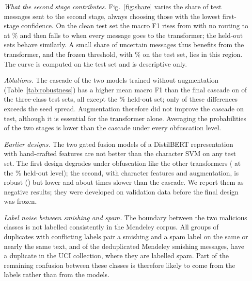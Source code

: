\emph{What the second stage contributes.} Fig.~\ref{fig:share} varies the share of test messages sent to the second stage, always choosing those with the lowest first-stage confidence. On the clean test set the macro F1 rises from  with no routing to  at \% and then falls to  when every message goes to the transformer; the held-out sets behave similarly. A small share of uncertain messages thus benefits from the transformer, and the frozen threshold, with \% on the test set, lies in this region. The curve is computed on the test set and is descriptive only.

\emph{Ablations.} The cascade of the two models trained without augmentation (Table~\ref{tab:robustness}) has a higher mean macro F1 than the final cascade on  of the  three-class test sets, all except the \% held-out set; only  of these differences exceeds the seed spread. Augmentation therefore did not improve the cascade on test, although it is essential for the transformer alone. Averaging the probabilities of the two stages is lower than the cascade under every obfuscation level.

\emph{Earlier designs.} The two gated fusion models of a DistilBERT representation with hand-crafted features are not better than the character SVM on any test set. The first design degrades under obfuscation like the other transformers ( at the \% held-out level); the second, with character features and augmentation, is robust () but lower and about  times slower than the cascade. We report them as negative results; they were developed on validation data before the final design was frozen.

\emph{Label noise between smishing and spam.} The boundary between the two malicious classes is not labelled consistently in the Mendeley corpus. All  groups of duplicates with conflicting labels pair a smishing and a spam label on the same or nearly the same text, and of the  deduplicated Mendeley smishing messages,  have a duplicate in the UCI collection, where they are labelled spam. Part of the remaining confusion between these classes is therefore likely to come from the labels rather than from the models.



